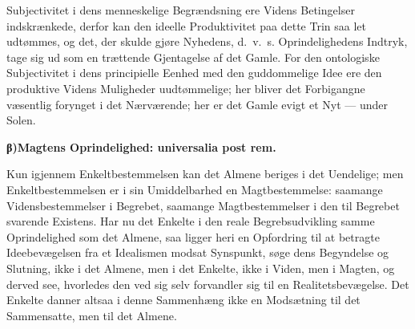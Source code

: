 \documentclass[12pt]{book}
\newcommand{\opage}[1]{\marginnote{\footnotesize\textit{[#1]}}}
\begin{document}
Subjectivitet i dens menneskelige Begrændsning ere Videns Betingelser indskrænkede, derfor
\opage{193} kan den ideelle Produktivitet paa dette Trin saa let udtømmes, og det, der skulde gjøre Nyhedens,
d.\ v.\ s. Oprindelighedens Indtryk, tage sig ud som en trættende Gjentagelse af det Gamle. For
den ontologiske Subjectivitet i dens principielle Eenhed med den guddommelige Idee ere den
produktive Videns Muligheder uudtømmelige; her bliver det Forbigangne væsentlig forynget i det
Nærværende; her er det Gamle evigt et Nyt --- under Solen.

\begin{center}{\bfseries β)\quad Magtens Oprindelighed: universalia post rem.}\end{center}

Kun igjennem Enkeltbestemmelsen kan det Almene beriges i det Uendelige; men Enkeltbestemmelsen er
i sin Umiddelbarhed en Magtbestemmelse: saamange Vidensbestemmelser i Begrebet, saamange
Magtbestemmelser i den til Begrebet svarende Existens. Har nu det Enkelte i den reale
Begrebsudvikling samme Oprindelighed som det Almene, saa ligger heri en Opfordring til at betragte
Ideebevægelsen fra et Idealismen modsat Synspunkt, søge dens Begyndelse og Slutning, ikke i det
Almene, men i det Enkelte, ikke i Viden, men i Magten, og derved see, hvorledes den ved sig selv
forvandler sig til en Realitetsbevægelse. Det Enkelte danner altsaa i denne Sammenhæng ikke en
Modsætning til det Sammensatte, men til det Almene.
\end{document}
